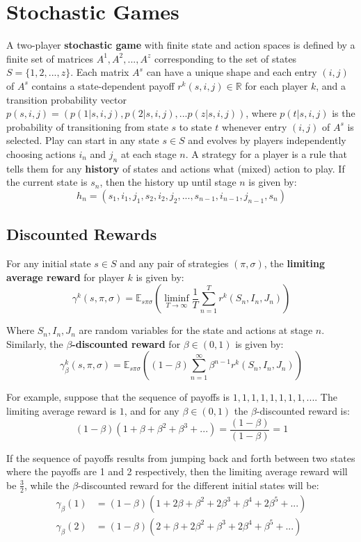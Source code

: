 \documentclass[12pt]{article}
\begin{document}
%
%
\newpage
\section{Stochastic Games}
A two-player \textbf{stochastic game} with finite state and action spaces is defined by a finite set of matrices $A^1, A^2, ... , A^z$ corresponding to the set of states $S = \{ 1, 2, ... , z \}$.
Each matrix $A^s$ can have a unique shape and each entry $(i, j)$ of $A^s$ contains a state-dependent payoff $r^k(s, i, j) \in \mathbb{R}$ for each player $k$, and a transition probability vector $p(s, i, j) = ( p(1|s, i, j), p(2|s, i, j), ... p(z|s, i, j) )$, where $p(t|s, i, j)$ is the probability of transitioning from state $s$ to state $t$ whenever entry $(i, j)$ of $A^s$ is selected.
Play can start in any state $s \in S$ and evolves by players independently choosing actions $i_n$ and $j_n$ at each stage $n$.
A strategy for a player is a rule that tells them for any \textbf{history} of states and actions what (mixed) action to play. If the current state is $s_n$, then the history up until stage $n$ is given by:
\[ h_n = (s_1, i_1, j_1, s_2, i_2, j_2, ... , s_{n-1}, i_{n-1}, j_{n-1}, s_n) \]

\subsection{Discounted Rewards}
For any initial state $s \in S$ and any pair of strategies $(\pi, \sigma)$, the \textbf{limiting average reward} for player $k$ is given by:
\[ \gamma^k(s, \pi, \sigma) = \mathbb{E}_{s\pi\sigma} \left( \liminf_{T \to \infty} \frac{1}{T} \sum_{n = 1}^{T} r^k(S_n, I_n, J_n) \right) \]

\noindent
Where $S_n, I_n, J_n$ are random variables for the state and actions at stage $n$.
Similarly, the \textbf{$\beta$-discounted reward} for $\beta \in (0, 1)$ is given by:
\[ \gamma^k_\beta(s, \pi, \sigma) = \mathbb{E}_{s\pi\sigma} \left( (1 - \beta) \sum_{n = 1}^{\infty} \beta^{n-1} r^k(S_n, I_n, J_n) \right) \]

\noindent
For example, suppose that the sequence of payoffs is $1, 1, 1, 1, 1, 1, 1, 1, ...$.
The limiting average reward is $1$, and for any $\beta \in (0, 1)$ the $\beta$-discounted reward is:
\[ (1 - \beta)\left( 1 + \beta + \beta^2 + \beta^3 + ... \right) = \frac{(1 - \beta)}{(1 - \beta)} = 1 \]

\noindent
If the sequence of payoffs results from jumping back and forth between two states where the payoffs are 1 and 2 respectively, then the limiting average reward will be $\frac{3}{2}$, while the $\beta$-discounted reward for the different initial states will be:
\begin{align*}
    \gamma_\beta(1) &= (1 - \beta)\left( 1 + 2\beta + \beta^2 + 2\beta^3 + \beta^4 + 2\beta^5 + ... \right) \\
    \gamma_\beta(2) &= (1 - \beta)\left( 2 + \beta + 2\beta^2 + \beta^3 + 2\beta^4 + \beta^5 + ... \right)
\end{align*}
\end{document}
